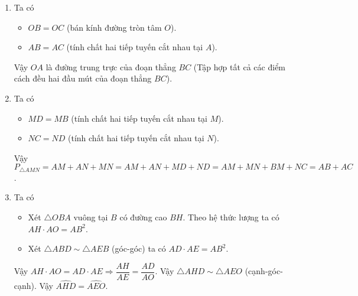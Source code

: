 \begin{bt}
{\begin{center}
\begin{tikzpicture}[scale=1, line join=round, line cap=round, >=stealth]
			\end{tikzpicture}
		\end{center}
	\begin{enumerate}
		\item Ta có
				\begin{itemize}
					\item $OB=OC$ (bán kính đường tròn tâm $O$).
					\item $AB=AC$ (tính chất hai tiếp tuyến cắt nhau tại $A$).
				\end{itemize}
			Vậy $OA$ là đường trung trực của đoạn thẳng $BC$ (Tập hợp tất cả các điểm cách đều hai đầu mút của đoạn thẳng $BC$).
		\item Ta có 
				\begin{itemize}
					\item $MD=MB$ (tính chất hai tiếp tuyến cắt nhau tại $M$).
					\item $NC=ND$ (tính chất hai tiếp tuyến cắt nhau tại $N$).
				\end{itemize}
			Vậy $P_{\triangle AMN}=AM+AN+MN=AM+AN+MD+ND=AM+MN+BM+NC=AB+AC$.
		\item Ta có
			\begin{itemize}
				\item Xét $\triangle OBA$ vuông tại $B$ có đường cao $BH$. Theo hệ thức lượng ta có $AH\cdot AO=AB^2$.
				\item Xét $\triangle ABD \sim \triangle AEB$ (góc-góc) ta có $AD\cdot AE=AB^2$.
			\end{itemize}
			Vậy $AH\cdot AO=AD\cdot AE \Rightarrow \dfrac{AH}{AE}=\dfrac{AD}{AO}$. Vậy $\triangle AHD\sim \triangle AEO$ (cạnh-góc-cạnh). Vậy $\widehat{AHD}=\widehat{AEO}$.
	\end{enumerate}
	}
\end{bt}

